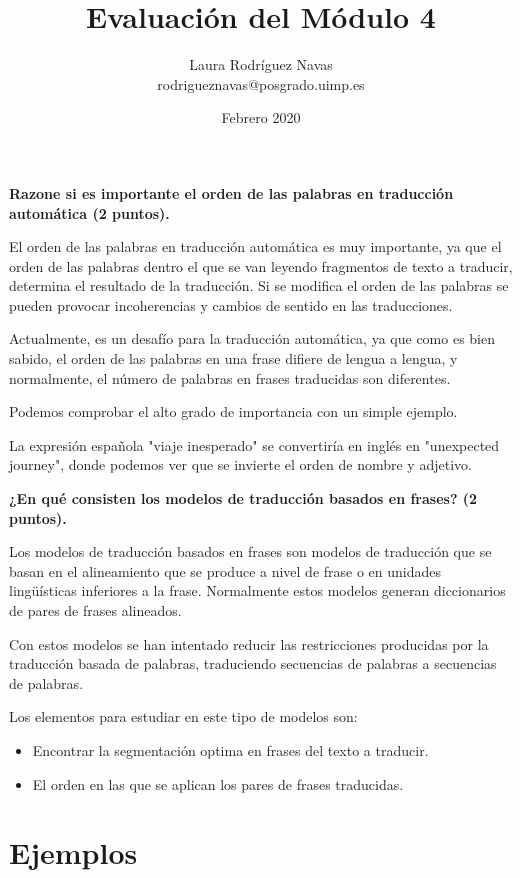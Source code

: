 \documentclass[11pt]{exam}
\title{Evaluación del Módulo 4}
\author{Laura Rodríguez Navas \\ rodrigueznavas@posgrado.uimp.es}
\date{Febrero 2020}
\begin{document}
	
\maketitle

\begin{questions}
	
{\bf \question Razone si es importante el orden de las palabras en traducción automática (2 puntos).}

El orden de las palabras en traducción automática es muy importante, ya que el orden de las palabras dentro el que se van leyendo fragmentos de texto a traducir, determina el resultado de la traducción. Si se modifica el orden de las palabras se pueden provocar incoherencias y cambios de sentido en las traducciones.

Actualmente, es un desafío para la traducción automática, ya que como es bien sabido, el orden de las palabras en una frase difiere de lengua a lengua, y normalmente, el número de palabras en frases traducidas son diferentes.

Podemos comprobar el alto grado de importancia con un simple ejemplo.

La expresión española "viaje inesperado" se convertiría en inglés en "unexpected journey", donde podemos ver que se invierte el orden de nombre y adjetivo. 

{\bf \question ¿En qué consisten los modelos de traducción basados en frases? (2 puntos).}

Los modelos de traducción basados en frases son modelos de traducción que se basan en el alineamiento que se produce a nivel de frase o en unidades lingüísticas inferiores a la frase. Normalmente estos modelos generan diccionarios de pares de frases alineados.

Con estos modelos se han intentado reducir las restricciones producidas por la traducción basada de palabras, traduciendo secuencias de palabras a secuencias de palabras.

Los elementos para estudiar en este tipo de modelos son: 

\begin{itemize}
	\item Encontrar la segmentación optima en frases del texto a traducir.
	\item El orden en las que se aplican los pares de frases traducidas.
\end{itemize}

\section*{Ejemplos}


\end{questions}
\end{document}
